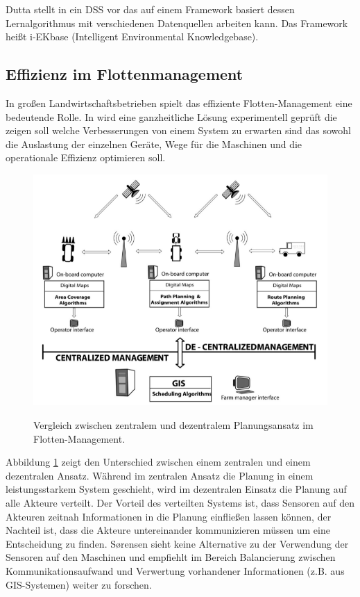 Dutta stellt in \cite{jour:Dutta2014} ein DSS vor das auf einem Framework basiert dessen Lernalgorithmus mit verschiedenen Datenquellen arbeiten kann. Das Framework heißt i-EKbase (Intelligent Environmental Knowledgebase).

\subsection{Effizienz im Flottenmanagement}
In großen Landwirtschaftsbetrieben spielt das effiziente Flotten-Management eine bedeutende Rolle. In \cite{jour:Sorensen2010} wird eine ganzheitliche Lösung experimentell geprüft die zeigen soll welche Verbesserungen von einem System zu erwarten sind das sowohl die Auslastung der einzelnen Geräte, Wege für die Maschinen und die operationale Effizienz optimieren soll.

\begin{figure}[h]
 \includegraphics[scale=0.5,natwidth=\textwidth]{figures/designtools/centralized_vs_decentralized.png}
 \centering
 \label{fig:centralized_vs_decentralized}
 \caption{Vergleich zwischen zentralem und dezentralem Planungsansatz im Flotten-Management.}
\end{figure}

Abbildung \ref{fig:centralized_vs_decentralized} zeigt den Unterschied zwischen einem zentralen und einem dezentralen Ansatz. Während im zentralen Ansatz die Planung in einem leistungsstarkem System geschieht, wird im dezentralen Einsatz die Planung auf alle Akteure verteilt. Der Vorteil des verteilten Systems ist, dass Sensoren auf den Akteuren zeitnah Informationen in die Planung einfließen lassen können, der Nachteil ist, dass die Akteure untereinander kommunizieren müssen um eine Entscheidung zu finden. S\o rensen sieht keine Alternative zu der Verwendung der Sensoren auf den Maschinen und empfiehlt im Bereich Balancierung zwischen Kommunikationsaufwand und Verwertung vorhandener Informationen (z.B. aus GIS-Systemen) weiter zu forschen.

